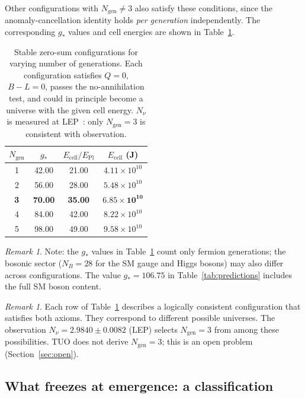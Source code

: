 \documentclass[12pt,a4paper]{article}
\theoremstyle{definition}
\theoremstyle{remark}
\newtheorem{remark}[theorem]{Remark}
\newcommand{\EPl}{E_{\mathrm{Pl}}}
\newcommand{\gstar}{g_{*}}
\begin{document}
Other configurations with $N_\mathrm{gen} \neq 3$ also satisfy these
conditions, since the anomaly-cancellation identity holds
\emph{per generation} independently.
The corresponding $\gstar$ values and cell energies are shown in
Table~\ref{tab:configs}.

\begin{table}[ht]
\centering
\caption{Stable zero-sum configurations for varying number of generations.
Each configuration satisfies $Q = 0$, $B - L = 0$, passes the no-annihilation
test, and could in principle become a universe with the given cell energy.
$N_\nu$ is measured at LEP~\cite{PDG2022}: only $N_\mathrm{gen} = 3$ is
consistent with observation.}
\label{tab:configs}
\begin{tabular}{cccc}
\toprule
$N_\mathrm{gen}$ & $\gstar$ & $E_\mathrm{cell}/\EPl$ & $E_\mathrm{cell}$ (J) \\
\midrule
1 & 42.00 & 21.00 & $4.11 \times 10^{10}$ \\
2 & 56.00 & 28.00 & $5.48 \times 10^{10}$ \\
\textbf{3} & \textbf{70.00} & \textbf{35.00} & $\mathbf{6.85 \times 10^{10}}$ \\
4 & 84.00 & 42.00 & $8.22 \times 10^{10}$ \\
5 & 98.00 & 49.00 & $9.58 \times 10^{10}$ \\
\bottomrule
\end{tabular}
\end{table}

\begin{remark}
Note: the $\gstar$ values in Table~\ref{tab:configs} count only fermion
generations; the bosonic sector ($N_B = 28$ for the SM gauge and Higgs
bosons) may also differ across configurations.
The value $\gstar = 106.75$ in Table~\ref{tab:predictions} includes the
full SM boson content.
\end{remark}

\begin{remark}
Each row of Table~\ref{tab:configs} describes a logically consistent
configuration that satisfies both axioms. They correspond to different
possible universes. The observation $N_\nu = 2.9840 \pm 0.0082$ (LEP)
selects $N_\mathrm{gen} = 3$ from among these possibilities.
TUO does not derive $N_\mathrm{gen} = 3$; this is an open problem
(Section~\ref{sec:open}).
\end{remark}

\subsection{What freezes at emergence: a classification}
\end{document}
